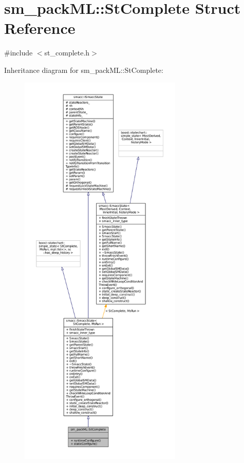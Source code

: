\hypertarget{structsm__packML_1_1StComplete}{}\section{sm\+\_\+pack\+ML\+:\+:St\+Complete Struct Reference}
\label{structsm__packML_1_1StComplete}


{\ttfamily \#include $<$st\+\_\+complete.\+h$>$}



Inheritance diagram for sm\+\_\+pack\+ML\+:\+:St\+Complete\+:
\nopagebreak
\begin{figure}[H]
\begin{center}
\leavevmode
\includegraphics[height=550pt]{structsm__packML_1_1StComplete__inherit__graph}
\end{center}
\end{figure}


